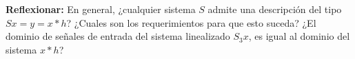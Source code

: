 \documentclass[12pt,a4paper]{report}
\begin{document}
\begin{enumerate}[label=\alph*)]
\begin{table}[h!]
\begin{tabular}{|c|c|c|c|}
        \end{tabular}
      \end{table}
      \textbf{Reflexionar:} En general, ¿cualquier sistema $S$ admite una descripción del tipo $S{x} = y = x * h$?
      ¿Cuales son los requerimientos para que esto suceda? ¿El dominio de señales de entrada del sistema linealizado
      $S_3{x}$, es igual al dominio del sistema $x * h$?


  \end{enumerate}
\end{document}
